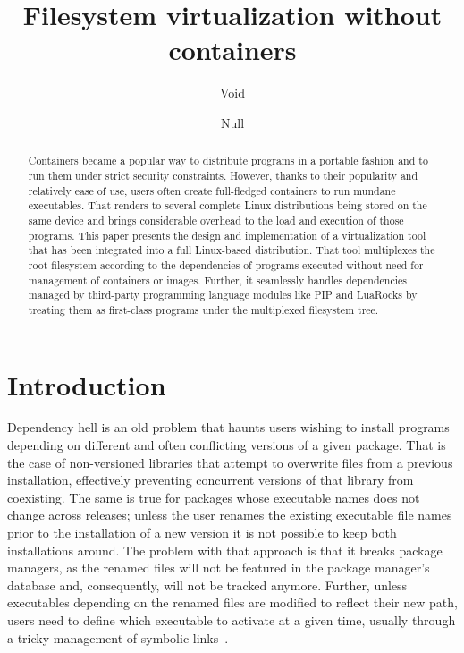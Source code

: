 \documentclass[sigplan, anonymous]{acmart}
\begin{document}
\title{Filesystem virtualization without containers}

\author{Void}

\author{Null}

\renewcommand{\shortauthors}{Void et al.}

\begin{abstract}
Containers became a popular way to distribute programs in a portable fashion and to run them
under strict security constraints. However, thanks to their popularity and relatively ease
of use, users often create full-fledged containers to run mundane executables. That renders to
several complete Linux distributions being stored on the same device and brings considerable
overhead to the load and execution of those programs. This paper presents the design and
implementation of a virtualization tool that has been integrated into a full Linux-based
distribution. That tool multiplexes the root filesystem according to the dependencies of programs
executed without need for management of containers or images. Further, it seamlessly handles
dependencies managed by third-party programming language modules like PIP and LuaRocks by treating
them as first-class programs under the multiplexed filesystem tree.
\end{abstract}

\maketitle

\section{Introduction}
Dependency hell is an old problem that haunts users wishing to install programs depending on
different and often conflicting versions of a given package. That is the case of non-versioned
libraries that attempt to overwrite files from a previous installation, effectively preventing
concurrent versions of that library from coexisting. The same is true for packages whose executable
names does not change across releases; unless the user renames the existing executable file names
prior to the installation of a new version it is not possible to keep both installations around.
The problem with that approach is that it breaks package managers, as the renamed files will not
be featured in the package manager's database and, consequently, will not be tracked anymore. Further, 
unless executables depending on the renamed files are modified to reflect their new path, users need
to define which executable to activate at a given time, usually through a tricky management of
symbolic links~\cite{RHEL?}.
\end{document}

